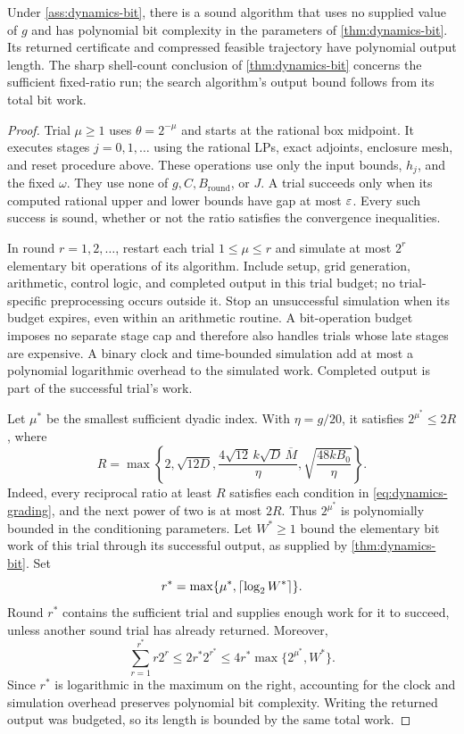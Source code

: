 \begin{theorem}
\label{thm:dynamics-unknown-growth}
Under \cref{ass:dynamics-bit}, there is a sound algorithm that uses no
supplied value of $g$ and has polynomial bit complexity in the parameters
of \cref{thm:dynamics-bit}.  Its returned certificate and compressed
feasible trajectory have polynomial output length.  The sharp shell-count
conclusion of \cref{thm:dynamics-bit} concerns the sufficient fixed-ratio
run; the search algorithm's output bound follows from its total bit work.
\end{theorem}

\begin{proof}
Trial $\mu\ge1$ uses $\theta=2^{-\mu}$ and starts at the rational box
midpoint.  It executes stages $j=0,1,\ldots$ using the rational LPs,
exact adjoints, enclosure mesh, and reset procedure above.  These operations
use only the input bounds, $h_j$, and the fixed $\omega$.  They use none
of $g,C,B_{\mathrm{round}}$, or $J$.  A trial succeeds only when its
computed rational upper and lower bounds have gap at most $\varepsilon$.
Every such success is sound, whether or not the ratio satisfies the
convergence inequalities.

In round $r=1,2,\ldots$, restart each trial $1\le\mu\le r$ and simulate
at most $2^r$ elementary bit operations of its algorithm.  Include setup,
grid generation, arithmetic, control logic, and completed output in this
trial budget; no trial-specific preprocessing occurs outside it.  Stop an
unsuccessful simulation when its budget expires, even within an arithmetic
routine.  A bit-operation budget imposes no separate stage cap and therefore
also handles trials whose late stages are expensive.  A binary clock and
time-bounded simulation add at most a polynomial logarithmic overhead to
the simulated work.  Completed output is part of the successful trial's
work.

Let $\mu^*$ be the smallest sufficient dyadic index.  With
$\eta=g/20$, it satisfies $2^{\mu^*}\le2R$, where
\[
 R=\max\left\{2,\sqrt{12D},
       \frac{4\sqrt{12}\,k\sqrt D\,\overline M}{\eta},
       \sqrt{\frac{48kB_0}{\eta}}\right\}.
\]
Indeed, every reciprocal ratio at least $R$ satisfies each condition in
\cref{eq:dynamics-grading}, and the next power of two is at most $2R$.
Thus $2^{\mu^*}$ is polynomially bounded in the conditioning parameters.
Let $W^*\ge1$ bound the elementary bit work of this trial through its
successful output, as supplied by \cref{thm:dynamics-bit}.  Set
\[
 r^*=\max\{\mu^*,\left\lceil \log_2W^*\right\rceil\}.
\]
Round $r^*$ contains the sufficient trial and supplies enough work for it
to succeed, unless another sound trial has already returned.  Moreover,
\begin{equation}
 \sum_{r=1}^{r^*}r2^r\le2r^*2^{r^*}
       \le4r^*\max\{2^{\mu^*},W^*\}.
 \label{eq:bit-budget}
\end{equation}
Since $r^*$ is logarithmic in the maximum on the right, accounting for the
clock and simulation overhead preserves polynomial bit complexity.
Writing the returned output was budgeted, so its length is bounded by the
same total work.


\end{proof}
